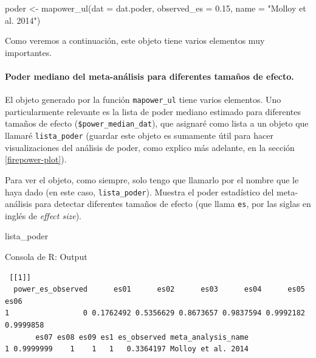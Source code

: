 \documentclass[
  bookmarksnumbered]{article}
\newenvironment{Shaded}{\begin{snugshade}}{\end{snugshade}}
\newcommand{\AttributeTok}[1]{\textcolor[rgb]{0.00,0.34,0.68}{#1}}
\newcommand{\FloatTok}[1]{\textcolor[rgb]{0.69,0.50,0.00}{#1}}
\newcommand{\FunctionTok}[1]{\textcolor[rgb]{0.39,0.29,0.61}{#1}}
\newcommand{\NormalTok}[1]{\textcolor[rgb]{0.12,0.11,0.11}{#1}}
\newcommand{\OtherTok}[1]{\textcolor[rgb]{0.00,0.43,0.16}{#1}}
\newcommand{\SpecialCharTok}[1]{\textcolor[rgb]{0.24,0.68,0.91}{#1}}
\newcommand{\StringTok}[1]{\textcolor[rgb]{0.75,0.01,0.01}{#1}}
\begin{document}
\begin{Shaded}
\begin{Highlighting}[]
\NormalTok{poder }\OtherTok{\textless{}{-}} \FunctionTok{mapower\_ul}\NormalTok{(}\AttributeTok{dat =}\NormalTok{ dat.poder, }\AttributeTok{observed\_es =} \FloatTok{0.15}\NormalTok{, }\AttributeTok{name =} \StringTok{"Molloy et al. 2014"}\NormalTok{)}
\end{Highlighting}
\end{Shaded}

Como veremos a continuación, este objeto tiene varios elementos muy importantes.

\hypertarget{poder-mediano}{%
\paragraph{Poder mediano del meta-análisis para diferentes tamaños de efecto.}\label{poder-mediano}}

El objeto generado por la función \texttt{mapower\_ul} tiene varios elementos. Uno particularmente relevante es la lista de poder mediano estimado para diferentes tamaños de efecto (\texttt{\$power\_median\_dat}), que asignaré como lista a un objeto que llamaré \texttt{lista\_poder} (guardar este objeto es sumamente útil para hacer visualizaciones del análisis de poder, como explico más adelante, en la sección \ref{firepower-plot}).

\begin{Shaded}
\end{Shaded}

Para ver el objeto, como siempre, solo tengo que llamarlo por el nombre que le haya dado (en este caso, \texttt{lista\_poder}). Muestra el poder estadístico del meta-análisis para detectar diferentes tamaños de efecto (que llama \texttt{es}, por las siglas en inglés de \emph{effect size}).

\begin{Shaded}
\begin{Highlighting}[]
\NormalTok{lista\_poder}
\end{Highlighting}
\end{Shaded}

\begin{ROut}{Consola de R: Output~\thetcbcounter}
                \begin{footnotesize}
                \begin{verbatim} [[1]]
  power_es_observed      es01      es02      es03      es04      es05      es06
1                 0 0.1762492 0.5356629 0.8673657 0.9837594 0.9992182 0.9999858
       es07 es08 es09 es1 es_observed meta_analysis_name
1 0.9999999    1    1   1   0.3364197 Molloy et al. 2014
 \end{verbatim}
                \end{footnotesize}
                \end{ROut}
\end{document}
